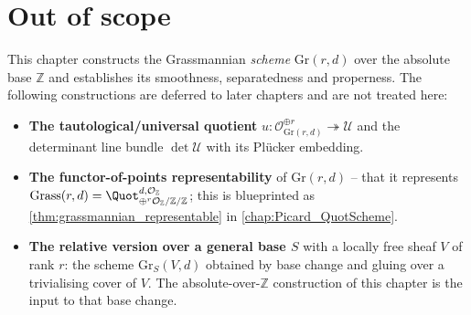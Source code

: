 \section{Out of scope}
\label{sec:gr_out_of_scope}

This chapter constructs the Grassmannian \emph{scheme} \(\mathrm{Gr}(r,d)\) over
the absolute base \(\mathbb{Z}\) and establishes its smoothness, separatedness
and properness. The following constructions are deferred to later chapters and
are not treated here:
\begin{itemize}
  \item \textbf{The tautological/universal quotient} \(u : \mathcal{O}^{\oplus
    r}_{\mathrm{Gr}(r,d)} \twoheadrightarrow \mathcal{U}\) and the determinant
    line bundle \(\det \mathcal{U}\) with its Pl\"ucker embedding.
  \item \textbf{The functor-of-points representability} of \(\mathrm{Gr}(r,d)\)
    -- that it represents \(\mathrm{Grass}(r,d) =
    \Quot^{d,\mathcal{O}_{\mathbb{Z}}}_{\oplus^r \mathcal{O}_{\mathbb{Z}} /
    \mathbb{Z} / \mathbb{Z}}\); this is blueprinted as
    \cref{thm:grassmannian_representable} in
    \cref{chap:Picard_QuotScheme}.
  \item \textbf{The relative version over a general base \(S\)} with a locally
    free sheaf \(V\) of rank \(r\): the scheme \(\mathrm{Gr}_S(V,d)\) obtained by
    base change and gluing over a trivialising cover of \(V\). The
    absolute-over-\(\mathbb{Z}\) construction of this chapter is the input to
    that base change.
\end{itemize}
